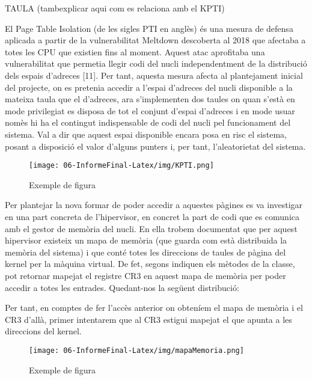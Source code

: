 ﻿\documentclass[10pt,a4paper,twocolumn,twoside]{article}
\begin{document}
TAULA
(tambexplicar aqui com es relaciona amb el KPTI)


El Page Table Isolation (de les sigles PTI en anglès) és una mesura de defensa aplicada a partir de la vulnerabilitat Meltdown descoberta al 2018 que afectaba a totes les CPU que existien fins al moment. Aquest atac aprofitaba una vulnerabilitat que permetia llegir codi del nucli independentment de la distribució dels espais d’adreces [11]. Per tant, aquesta mesura afecta al plantejament inicial del projecte, on es pretenia accedir a l’espai d’adreces del nucli disponible a la mateixa taula que el d’adreces, ara s’implementen dos taules on quan s’està en mode privilegiat es disposa de tot el conjunt d’espai d’adreces i en mode usuar nomès hi ha el contingut indispensable de codi del nucli pel funcionament del sistema. Val a dir que aquest espai disponible encara posa en risc el sistema, posant a disposició el valor d’alguns punters i, per tant, l’aleatorietat del sistema.

\begin{figure}[!h]
\centering
	\texttt{[image: 06-InformeFinal-Latex/img/KPTI.png]}
	\caption{Exemple de figura}
	\label{KPTI}
\end{figure}

Per plantejar la nova formar de poder accedir a aquestes pàgines es va investigar en una part concreta de l’hipervisor, en concret la part de codi que es comunica amb el gestor de memòria del nucli. En ella trobem documentat que per aquest hipervisor existeix un mapa de memòria (que guarda com està distribuida la memòria del sistema) i que conté totes les direccions de taules de pàgina del kernel per la màquina virtual. De fet, segons indiquen els mètodes de la classe, pot retornar mapejat el registre CR3 en aquest mapa de memòria per poder accedir a totes les entrades. Quedant-nos la següent distribució:

Per tant, en comptes de fer l’accès anterior on obteníem el mapa de memòria i el CR3 d’allà, primer intentarem que al CR3 estigui mapejat el que apunta a les direccions del kernel.

\begin{figure}[!h]
\centering
	\texttt{[image: 06-InformeFinal-Latex/img/mapaMemoria.png]}
	\caption{Exemple de figura}
	\label{mapesMemoria}
\end{figure}
\end{document}
